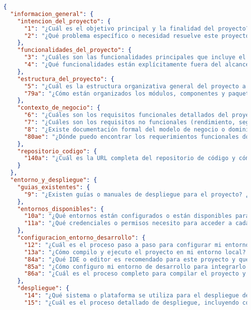 \begin{lstlisting}[language=json, caption={Listado de elicitación de preguntas procesadas y clasificadas}, label={listado:preguntas}]
{
  "informacion_general": {
    "intencion_del_proyecto": {
      "1": "¿Cuál es el objetivo principal y la finalidad del proyecto?",
      "2": "¿Qué problema específico o necesidad resuelve este proyecto?"
    },
    "funcionalidades_del_proyecto": {
      "3": "¿Cuáles son las funcionalidades principales que incluye el proyecto?",
      "4": "¿Qué funcionalidades están explícitamente fuera del alcance del proyecto?"
    },
    "estructura_del_proyecto": {
      "5": "¿Cuál es la estructura organizativa general del proyecto a nivel de repositorios o subproyectos?",
      "79a": "¿Cómo están organizados los módulos, componentes y paquetes dentro del proyecto?"
    },
    "contexto_de_negocio": {
      "6": "¿Cuáles son los requisitos funcionales detallados del proyecto?",
      "7": "¿Cuáles son los requisitos no funcionales (rendimiento, seguridad, escalabilidad, etc.) del proyecto?",
      "8": "¿Existe documentación formal del modelo de negocio o dominio? ¿Dónde se encuentra?",
      "80ae": "¿Dónde puedo encontrar los requerimientos funcionales documentados para entender el problema a resolver?"
    },
    "repositorio_codigo": {
      "140a": "¿Cuál es la URL completa del repositorio de código y cómo puedo acceder a él?"
    }
  },
  "entorno_y_despliegue": {
    "guias_existentes": {
      "9": "¿Existen guías o manuales de despliegue para el proyecto? ¿Dónde puedo encontrarlas?"
    },
    "entornos_disponibles": {
      "10a": "¿Qué entornos están configurados o están disponibles para el proyecto (desarrollo, pruebas, preproducción, producción, etc.)?",
      "11a": "¿Qué credenciales o permisos necesito para acceder a cada entorno (VPN, usuarios, certificados, etc.)?"
    },
    "configuracion_entorno_desarrollo": {
      "12": "¿Cuál es el proceso paso a paso para configurar mi entorno de desarrollo local (IDE, herramientas, plugins)?",
      "13a": "¿Cómo compilo y ejecuto el proyecto en mi entorno local? ¿Qué comandos debo utilizar?",
      "84a": "¿Qué IDE o editor es recomendado para este proyecto y qué configuraciones específicas requiere?",
      "85a": "¿Cómo configuro mi entorno de desarrollo para integrarlo con los sistemas corporativos?",
      "86a": "¿Cuál es el proceso completo para compilar el proyecto y verificar que funciona correctamente?"
    },
    "despliegue": {
      "14": "¿Qué sistema o plataforma se utiliza para el despliegue de aplicaciones?",
      "15": "¿Cuál es el proceso detallado de despliegue, incluyendo configuraciones, tecnologías y herramientas utilizadas?",

\end{lstlisting}
